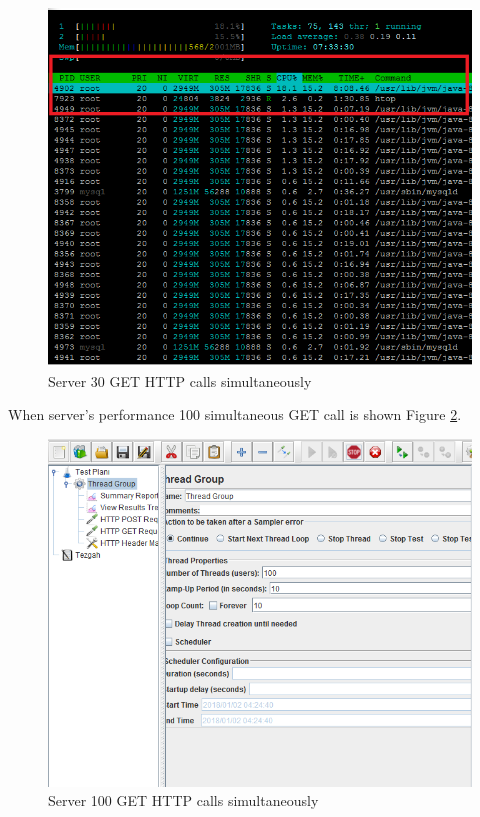 \begin{figure}[!htbp]
\centering
\includegraphics[width=\textwidth]{projectChapters/images/30users2.png}
\caption{Server 30 GET HTTP calls simultaneously}
\label{fig:30users}
\end{figure}

\newpage

When server's performance 100 simultaneous GET call is shown Figure
\ref{fig:100users}.

\begin{figure}[!htbp]
\centering
\includegraphics[width=\textwidth]{projectChapters/images/100users1.png}
\caption{Server 100 GET HTTP calls simultaneously}
\label{fig:100users}
\end{figure}


